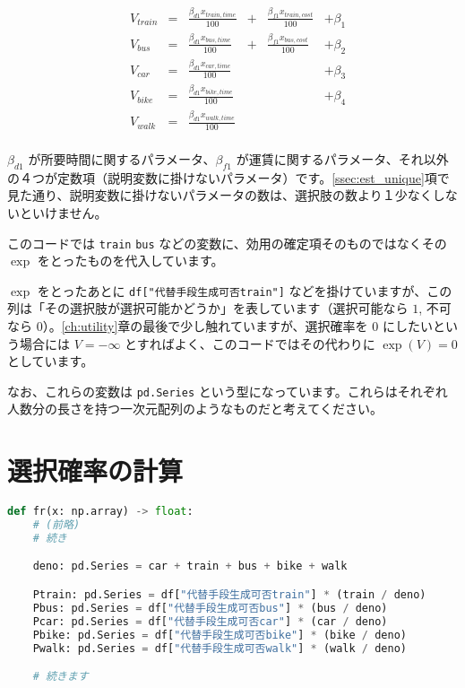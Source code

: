 \begin{equation}
    \label{eq:utility_sample}
    \begin{aligned}
         & V_{train} & = & \frac{\beta_{d1} x_{train, time}}{100} & + & \frac{\beta_{f1} x_{train, cost}}{100} & + \beta_1 \\
         & V_{bus}   & = & \frac{\beta_{d1} x_{bus, time}}{100}   & + & \frac{\beta_{f1} x_{bus, cost}}{100}   & + \beta_2 \\
         & V_{car}   & = & \frac{\beta_{d1} x_{car, time}}{100}   &   &                                        & + \beta_3 \\
         & V_{bike}  & = & \frac{\beta_{d1} x_{bike, time}}{100}  &   &                                        & + \beta_4 \\
         & V_{walk}  & = & \frac{\beta_{d1} x_{walk, time}}{100}                                                           \\
    \end{aligned}
\end{equation}

$\beta_{d1}$ が所要時間に関するパラメータ、$\beta_{f1}$ が運賃に関するパラメータ、それ以外の４つが定数項（説明変数に掛けないパラメータ）です。\ref{ssec:est_unique}項で見た通り、説明変数に掛けないパラメータの数は、選択肢の数より１少なくしないといけません。

このコードでは \lstinline{train} \lstinline{bus} などの変数に、効用の確定項そのものではなくその $\exp$ をとったものを代入しています。

$\exp$ をとったあとに \lstinline{df["代替手段生成可否train"]} などを掛けていますが、この列は「その選択肢が選択可能かどうか」を表しています（選択可能なら $1$, 不可なら $0$）。\ref{ch:utility}章の最後で少し触れていますが、選択確率を $0$ にしたいという場合には $V=-\infty$ とすればよく、このコードではその代わりに $\exp(V)=0$ としています。

なお、これらの変数は \lstinline{pd.Series} という型になっています。これらはそれぞれ人数分の長さを持つ一次元配列のようなものだと考えてください。

\section{選択確率の計算}

\begin{lstlisting}[caption=選択確率,language=Python]
def fr(x: np.array) -> float:
    # (前略)
    # 続き

    deno: pd.Series = car + train + bus + bike + walk

    Ptrain: pd.Series = df["代替手段生成可否train"] * (train / deno)
    Pbus: pd.Series = df["代替手段生成可否bus"] * (bus / deno)
    Pcar: pd.Series = df["代替手段生成可否car"] * (car / deno)
    Pbike: pd.Series = df["代替手段生成可否bike"] * (bike / deno)
    Pwalk: pd.Series = df["代替手段生成可否walk"] * (walk / deno)

    # 続きます
\end{lstlisting}

